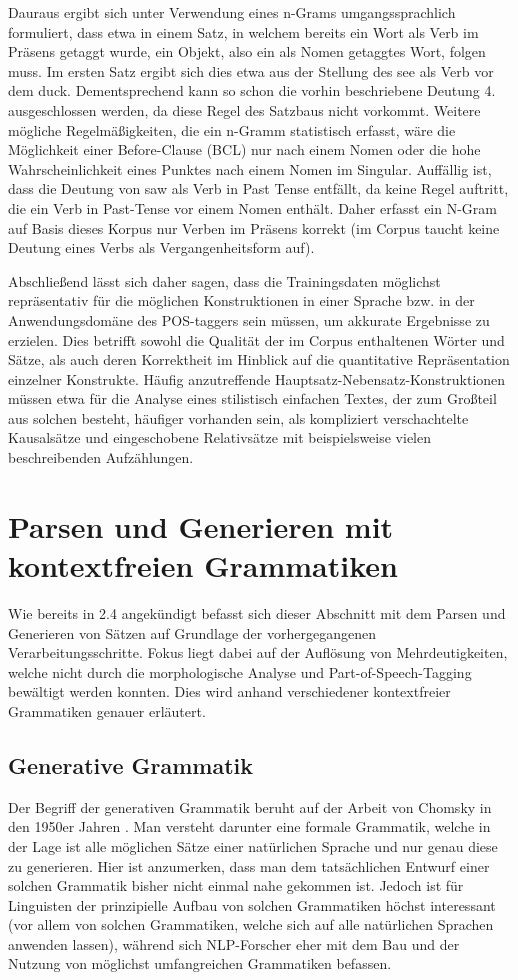\documentclass[12pt]{report}
\begin{document}
Dauraus ergibt sich unter Verwendung eines n-Grams umgangssprachlich formuliert, dass etwa in einem Satz, in welchem bereits ein Wort als Verb im Präsens getaggt wurde, ein Objekt, also ein als Nomen getaggtes Wort, folgen muss. Im ersten Satz ergibt sich dies etwa aus der Stellung des \glqq  see\grqq{} als Verb vor dem \glqq  duck\grqq{}. Dementsprechend kann so schon die vorhin beschriebene Deutung 4. ausgeschlossen werden, da diese Regel des Satzbaus nicht vorkommt. Weitere mögliche Regelmäßigkeiten, die ein n-Gramm statistisch erfasst, wäre die Möglichkeit einer Before-Clause (BCL) nur nach einem Nomen oder die hohe Wahrscheinlichkeit eines Punktes nach einem Nomen im Singular. Auffällig ist, dass die Deutung von saw als Verb in Past Tense entfällt, da keine Regel auftritt, die ein Verb in Past-Tense vor einem Nomen enthält. Daher erfasst ein N-Gram auf Basis dieses Korpus nur Verben im Präsens korrekt (im Corpus taucht keine Deutung eines Verbs als Vergangenheitsform auf). 

Abschließend lässt sich daher sagen, dass die Trainingsdaten möglichst repräsentativ für die möglichen Konstruktionen in einer Sprache bzw. in der Anwendungsdomäne des POS-taggers sein müssen, um akkurate Ergebnisse zu erzielen. Dies betrifft sowohl die Qualität der im Corpus enthaltenen Wörter und Sätze, als auch deren Korrektheit im Hinblick auf die quantitative Repräsentation einzelner Konstrukte. Häufig anzutreffende Hauptsatz-Nebensatz-Konstruktionen müssen etwa für die Analyse eines stilistisch einfachen Textes, der zum Großteil aus solchen besteht, häufiger vorhanden sein, als kompliziert verschachtelte Kausalsätze und eingeschobene Relativsätze mit beispielsweise vielen beschreibenden Aufzählungen.  

\section{Parsen und Generieren mit kontextfreien Grammatiken}
Wie bereits in 2.4 angekündigt befasst sich dieser Abschnitt mit dem Parsen und Generieren von Sätzen auf Grundlage der vorhergegangenen Verarbeitungsschritte. Fokus liegt dabei auf der Auflösung von Mehrdeutigkeiten, welche nicht durch die morphologische Analyse und Part-of-Speech-Tagging bewältigt werden konnten. Dies wird anhand verschiedener kontextfreier Grammatiken genauer erläutert. 

\subsection{Generative Grammatik}
Der Begriff der generativen Grammatik beruht auf der Arbeit von Chomsky in den 1950er Jahren \cite{cho57}. Man versteht darunter eine formale Grammatik, welche in der Lage ist alle möglichen Sätze einer natürlichen Sprache und nur genau diese zu generieren. Hier ist anzumerken, dass man dem tatsächlichen Entwurf einer solchen Grammatik bisher nicht einmal nahe gekommen ist. Jedoch ist für Linguisten der prinzipielle Aufbau von solchen Grammatiken höchst interessant (vor allem von solchen Grammatiken, welche sich auf alle natürlichen Sprachen anwenden lassen), während sich NLP-Forscher eher mit dem Bau und der Nutzung von möglichst umfangreichen Grammatiken befassen. 
\end{document}
